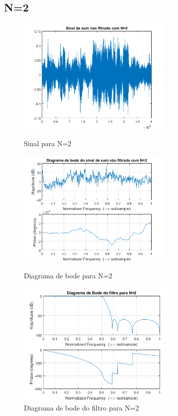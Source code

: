 \documentclass[11pt]{article}
\begin{document}
\subsection{N=2}
\begin{figure}[h]
\begin{center}
\begin{minipage}[b]{0.45\linewidth}
\includegraphics[width=7.5cm]{nfds2.png}
\caption{Sinal para N=2}
\label{figura8}
\end{minipage}
\begin{minipage}[b]{0.45\linewidth}
\includegraphics[width=7.5cm]{nfdb2.png}
\caption{Diagrama de bode para N=2}
\label{figura9}
\end{minipage}
\newline
\newline
\includegraphics[width=8cm]{filtro2.png}
\caption{Diagrama de bode do filtro para N=2}
\label{figura10}
\end{center}
\end{figure}
\end{document}
